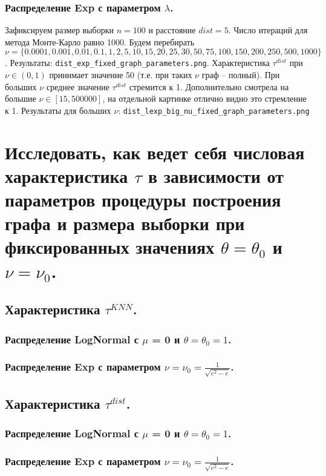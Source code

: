 \documentclass{report}
\begin{document}
\subsection{Распределение Exp с параметром $\lambda$.}
Зафиксируем размер выборки $n = 100$ и расстояние $dist = 5$. Число итераций для метода Монте-Карло равно 1000.
\newline
\newline
Будем перебирать $\nu = \{0.0001, 0.001, 0.01, 0.1, 1, 2, 5, 10, 15, 20, 25, 30, 50, 75, 100, 150, 200, 250, 500, 1000\}$.
\newline
\newline
Результаты: \texttt{dist\_exp\_fixed\_graph\_parameters.png}.
\newline
\newline
Характеристика $\tau^{dist}$ при $\nu \in (0, 1)$ принимает значение 50 (т.е. при таких $\nu$ граф -- полный). 
\newline
\newline
При больших $\nu$ среднее значение $\tau^{dist}$ стремится к 1. 
\newline
\newline
Дополнительно смотрела на большие $\nu \in [15, 500000]$, на отдельной картинке отлично видно это стремление к 1.
\newline
\newline
Результаты для больших $\nu$: \texttt{dist\_lexp\_big\_nu\_fixed\_graph\_parameters.png}

\chapter{Исследовать, как ведет себя числовая характеристика $\tau$ в зависимости от параметров процедуры построения графа и размера выборки при фиксированных значениях $\theta = \theta_0$ и $\nu = \nu_0$.}
\section{Характеристика $\tau^{KNN}$.}
\subsection{Распределение LogNormal с $\mu$ = 0 и $\theta = \theta_0 = 1$.}

\subsection{Распределение Exp с параметром $\nu = \nu_0 = \frac{1}{\sqrt{e^2 - e}}$.}

\section{Характеристика $\tau^{dist}$.}
\subsection{Распределение LogNormal с $\mu$ = 0 и $\theta = \theta_0 = 1$.}

\subsection{Распределение Exp с параметром $\nu = \nu_0 = \frac{1}{\sqrt{e^2 - e}}$.}
\end{document}
